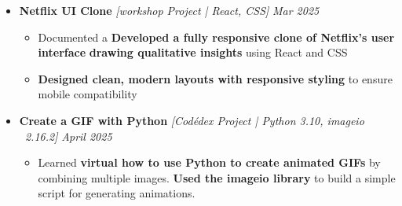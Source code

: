 \documentclass[a4paper,10pt]{article}
\begin{document}
\begin{itemize}

 \vspace{-0.5mm}
\item {\bf Netflix UI Clone
} \textit{[workshop Project | React, CSS]}
\textit{\hfill 
{Mar 2025}
}



\begin{itemize}


\vspace{-2mm}
\item Documented a \textbf{Developed a fully responsive clone of Netflix's user interface} 
 \textbf{drawing qualitative insights}  using React and CSS


\item \textbf{Designed clean, modern layouts with responsive styling }  to ensure mobile compatibility


\vspace{-2mm}
\end{itemize}
\end{itemize}




\begin{itemize}

 
 
\item {\bf Create a GIF with Python
} \textit{[Codédex Project | Python 3.10, imageio  2.16.2]}
\textit{\hfill 
{April 2025}
}

\begin{itemize}

\vspace{-1.5mm}

\item Learned \textbf{virtual how to use Python to create animated GIFs 
}by combining multiple images. \textbf{Used the imageio library} to build a simple script for generating animations.

\vspace{-2mm}
\end{itemize}
\end{itemize}
\end{document}
